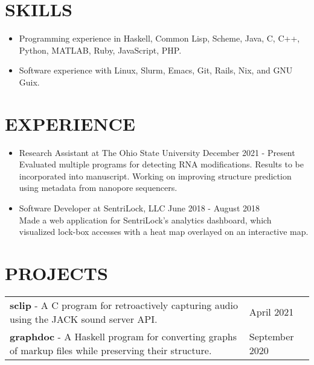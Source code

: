 \documentclass[line, margin]{res}
\begin{document}
\begin{resume}
  \section{SKILLS}
  \begin{itemize}
  \item Programming experience in Haskell, Common Lisp, Scheme, Java, C, C++,
    Python, MATLAB, Ruby, JavaScript, PHP.
  \item Software experience with Linux, Slurm, Emacs, Git, Rails, Nix, and GNU Guix.
  \end{itemize}

  \section{EXPERIENCE}
  \begin{itemize}
  \item Research Assistant at The Ohio State University \hfill December 2021 - Present \\
    Evaluated multiple programs for detecting RNA modifications. Results to be
    incorporated into manuscript. Working on improving structure prediction
    using metadata from nanopore sequencers. \\
  \item Software Developer at SentriLock, LLC \hfill June 2018 - August 2018 \\
    Made a web application for SentriLock's analytics dashboard, which visualized
    lock-box accesses with a heat map overlayed on an interactive map. \\
  \end{itemize}

  \section{PROJECTS}
  \begin{tabular}{ p{\dimexpr \textwidth-5cm \relax}>{\raggedleft\arraybackslash}p{4cm} }
    \textbf{sclip} - A C program for retroactively capturing audio using the
    JACK sound server API.  & April 2021 \\

    \textbf{graphdoc} - A Haskell program for converting graphs of markup files
    while preserving their structure.  & September 2020 \\
  \end{tabular}


\end{resume}
\end{document}
